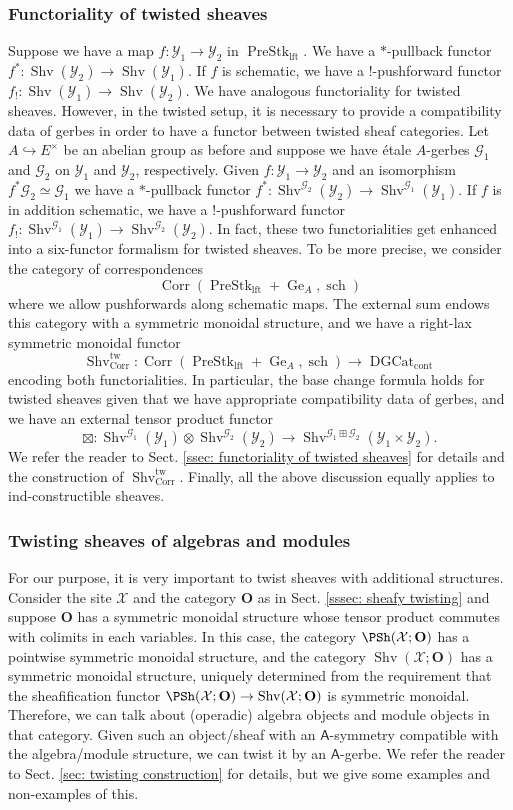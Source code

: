 \documentclass[10pt]{amsart}
\newcommand{\sssec}{\subsubsection}
\theoremstyle{remark}
\newcommand{\on}{\operatorname}
\newcommand{\cG}{\mathcal{G}}
\newcommand{\cX}{\mathcal{X}}
\newcommand{\cY}{\mathcal{Y}}
\newcommand{\DGcat}{\on{DGCat}_{\on{cont}}}
\newcommand{\Shv}{\on{Shv}}
\newcommand{\PreStklft}{\on{PreStk}_{\on{lft}}}
\newcommand{\bO}{\mathbf{O}}
\newcommand{\sfA}{\mathsf{A}}
\newcommand{\Corr}{\on{Corr}}
\begin{document}
\sssec{Functoriality of twisted sheaves}\label{sssec: functoriality twshv brief}
Suppose we have a map $f:\cY_1\rightarrow\cY_2$ in $\PreStklft$. We have a $*$-pullback functor $f^*:\Shv(\cY_2)\rightarrow\Shv(\cY_1)$. If $f$ is schematic, we have a $!$-pushforward functor $f_!:\Shv(\cY_1)\rightarrow\Shv(\cY_2)$. We have analogous functoriality for twisted sheaves. However, in the twisted setup, it is necessary to provide a compatibility data of gerbes in order to have a functor between twisted sheaf categories. Let $A\hookrightarrow E^{\times}$ be an abelian group as before and suppose we have \'etale $A$-gerbes $\cG_1$ and $\cG_2$ on $\cY_1$ and $\cY_2$, respectively. Given $f:\cY_1\rightarrow\cY_2$ and an isomorphism $f^*\cG_2\simeq \cG_1$ we have a $*$-pullback functor $f^*:\Shv^{\cG_2}(\cY_2)\rightarrow \Shv^{\cG_1}(\cY_1)$. If $f$ is in addition schematic, we have a $!$-pushforward functor $f_!:\Shv^{\cG_1}(\cY_1)\rightarrow \Shv^{\cG_2}(\cY_2)$. 
In fact, these two functorialities get enhanced into a six-functor formalism for twisted sheaves. To be more precise, we consider the category of correspondences \[\Corr(\PreStklft+\on{Ge}_A,\on{sch})\] where we allow pushforwards along schematic maps. The external sum endows this category with a symmetric monoidal structure, and we have a right-lax symmetric monoidal functor
\[\Shv^{\on{tw}}_{\Corr}:\Corr(\PreStklft+\on{Ge}_A,\on{sch})\rightarrow\DGcat\]
encoding both functorialities.
In particular, the base change formula holds for twisted sheaves given that we have appropriate compatibility data of gerbes, and we have an external tensor product functor
\begin{equation}\label{eq: box tensor}
    \boxtimes:\Shv^{\cG_1}(\cY_1)\otimes\Shv^{\cG_2}(\cY_2)\rightarrow \Shv^{\cG_1\boxplus\cG_2}(\cY_1\times\cY_2).
\end{equation}
We refer the reader to Sect. \ref{ssec: functoriality of twisted sheaves} for details and the construction of $\Shv^{\on{tw}}_{\Corr}$. Finally, all the above discussion equally applies to ind-constructible sheaves.

\sssec{Twisting sheaves of algebras and modules}\label{sssec: twisting example}
For our purpose, it is very important to twist sheaves with additional structures. Consider the site $\cX$ and the category $\bO$ as in Sect. \ref{sssec: sheafy twisting} and suppose $\bO$ has a symmetric monoidal structure whose tensor product commutes with colimits in each variables. In this case, the category $\PSh(\cX;\bO)$ has a pointwise symmetric monoidal structure, and the category $\Shv(\cX;\bO)$ has a symmetric monoidal structure, uniquely determined from the requirement that the sheafification functor $\PSh(\cX;\bO)\rightarrow \Shv(\cX;\bO)$ is symmetric monoidal. Therefore, we can talk about (operadic) algebra objects and module objects in that category. Given such an object/sheaf with an $\sfA$-symmetry compatible with the algebra/module structure, we can twist it by an $\sfA$-gerbe. We refer the reader to Sect. \ref{sec: twisting construction} for details, but we give some examples and non-examples of this.
\medskip
\end{document}
